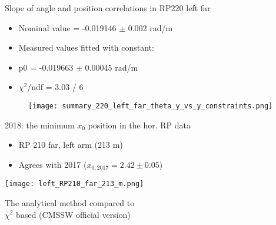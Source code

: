 \documentclass{beamer}
\begin{document}
\begin{frame}\scriptsize
	\begin{block}{Slope of angle and position correlations in RP220 left far}\scriptsize
	\begin{itemize}
		\item 	Nominal value = -0.019146 $\pm$ 0.002 rad/m
		\item Measured values fitted with constant:
		\item p0 = -0.019663   $\pm$   0.00045 rad/m
		\item $\chi^{2}$/ndf = 3.03 / 6
	\end{itemize}\vspace{-5mm}

	\begin{figure}
		\centering
             \texttt{[image: summary\_220\_left\_far\_theta\_y\_vs\_y\_constraints.png]}
	\end{figure}
	\end{block}
\end{frame}

\begin{frame}\scriptsize
	\begin{block}{2018: the minimum $x_{0}$ position in the hor. RP data}
	\begin{itemize}
		\item RP 210 far, left arm (213 m)
		\item Agrees with 2017 ($x_{0,2017}=2.42\pm 0.05$)
	\end{itemize}\vspace{-5mm}
		\begin{center}
        	     \texttt{[image: left\_RP210\_far\_213\_m.png]}
		\end{center}
	\end{block}
\end{frame}


\begin{frame}\scriptsize
	\Large
	\begin{center}
		The analytical method compared to\\ $\chi^{2}$ based (CMSSW official version)
	\end{center}
\end{frame}
\end{document}
